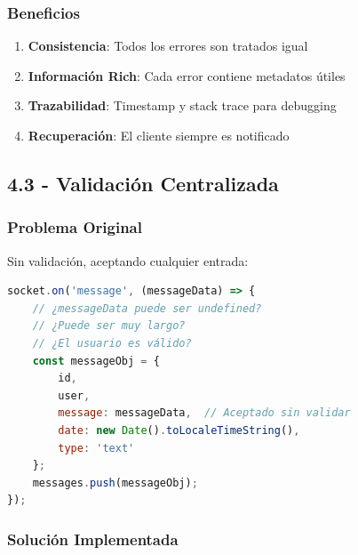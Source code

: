 \documentclass[12pt,a4paper]{article}
\begin{document}
\subsubsection{Beneficios}
\begin{enumerate}
    \item \textbf{Consistencia}: Todos los errores son tratados igual
    \item \textbf{Información Rich}: Cada error contiene metadatos útiles
    \item \textbf{Trazabilidad}: Timestamp y stack trace para debugging
    \item \textbf{Recuperación}: El cliente siempre es notificado
\end{enumerate}

\subsection{4.3 - Validación Centralizada}

\subsubsection{Problema Original}
Sin validación, aceptando cualquier entrada:

\begin{lstlisting}[caption=Problema Original - Sin Validación, language=JavaScript]
socket.on('message', (messageData) => {
    // ¿messageData puede ser undefined?
    // ¿Puede ser muy largo?
    // ¿El usuario es válido?
    const messageObj = {
        id,
        user,
        message: messageData,  // Aceptado sin validar
        date: new Date().toLocaleTimeString(),
        type: 'text'
    };
    messages.push(messageObj);
});
\end{lstlisting}

\subsubsection{Solución Implementada}
\end{document}
